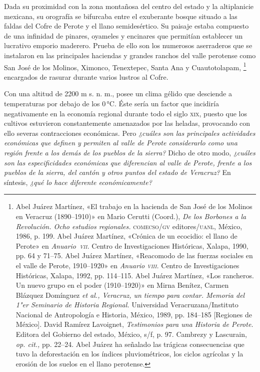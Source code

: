 \documentclass[14pt,twoside,final]{extbook} %
\let\oldfootnote\footnote
\renewcommand\footnote[1]{%
\oldfootnote{\hspace{1mm}#1}}
\begin{document}
Dada su proximidad con la zona montañosa del centro del estado y la altiplanicie mexicana, su orografía se bifurcaba entre el exuberante bosque situado a las faldas del Cofre de Perote y el llano semidesértico. Su paisaje estaba compuesto de una infinidad de pinares, oyameles y encinares que permitían establecer un lucrativo emporio maderero. Prueba de ello son los numerosos aserraderos que se instalaron en las principales haciendas y grandes ranchos del valle perotense como San José de los Molinos, Ximonco, Tenextepec, Santa Ana y Cuautotolapam,\footnote{Abel Juárez Martínez, «El trabajo en la hacienda de San José de los Molinos en Veracruz \mbox{(1890--1910)}» en Mario Cerutti (Coord.), \emph{De los Borbones a la Revolución. Ocho estudios regionales.} \textsc{comecso/gv} editores/\textsc{uanl}, México, 1986, p. 199. Abel Juárez Martínez, «Crónica de un ecocidio: el llano de Perote» en \emph{Anuario~\textsc{vii}.} Centro de Investigaciones Históricas, Xalapa, 1990, pp. 64 y 71--75. Abel Juárez Martínez, «Reacomodo de las fuerzas sociales en el valle de Perote, 1910--1920» en \emph{Anuario \textsc{viii}.} Centro de Investigaciones Históricas, Xalapa, 1992, pp. 114--115. Abel Juárez Martínez, «Los rancheros. Un nuevo grupo en el poder (\mbox{1910--1920})» en Mirna Benítez, Carmen Blázquez Domínguez \emph{et al., Veracruz, un tiempo para contar. Memoria del 1"er Seminario de Historia Regional.} Universidad Veracruzana/Instituto Nacional de Antropología e Historia, México, 1989, pp. 184--185 [Regiones de México]. David Ramírez Lavoignet, \emph{Testimonios para una Historia de Perote.} Editora del Gobierno del estado, México, s/f, p. 97. Cambrezy y Lascurain, \emph{op. cit.,} pp. 22--24. Abel Juárez ha señalado las trágicas consecuencias que tuvo la deforestación en los índices pluviométricos, los ciclos agrícolas y la erosión de los suelos en el llano perotense.\index[lugares]{Perote!llano}} encargados de rasurar durante varios lustros al Cofre.

Con una altitud de 2200 m s. n. m., posee un clima gélido que desciende a temperaturas por debajo de los 0\,°C. Éste sería un factor que incidiría negativamente en la economía regional durante todo el siglo \textsc{xix}, puesto que los cultivos estuvieron constantemente amenazados por las heladas, provocando con ello severas contracciones económicas. Pero \emph{¿cuáles son las principales actividades económicas que definen y permiten al valle de Perote considerarlo como una región frente a los demás de los pueblos de la sierra?} Dicho de otro modo, \emph{¿cuáles son las especificidades económicas que diferencian al valle de Perote, frente a los pueblos de la sierra, del cantón y otros puntos del estado de Veracruz?} En síntesis, \emph{¿qué lo hace diferente económicamente?}
\end{document}
